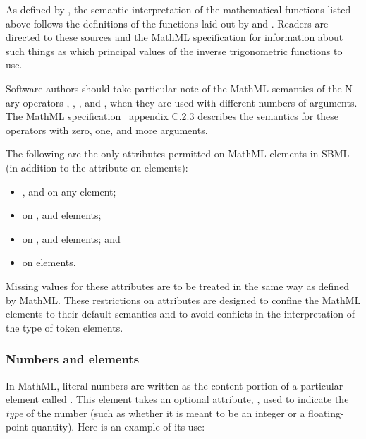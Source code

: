 As defined by \mathmltwo, the semantic interpretation of the
mathematical functions listed above follows the definitions of the
functions laid out by \cite{abramowitz:1997} and
\cite{zwillinger:1988}.  Readers are directed to these sources and
the MathML specification for information about such things as
which principal values of the inverse trigonometric functions to
use.

Software authors should take particular note of the MathML
semantics of the N-ary operators , ,
,  and , when they are used with
different numbers of arguments.  The MathML
specification~\citep{w3c:2000b} appendix C.2.3 describes the
semantics for these operators with zero, one, and more arguments.

The following are the only attributes permitted on MathML elements
in SBML (in addition to the  attribute on
 elements):
\begin{itemize}\setlength{\parskip}{-0.2ex}

\item {},  and  on any element;

\item {} on ,
     and  elements;

\item {} on , 
    and  elements; and

\item {} on  elements.

\end{itemize}\vspace*{-0.75ex}
Missing values for these attributes are to be treated in the same
way as defined by MathML.  These restrictions on attributes are
designed to confine the MathML elements to their default semantics
and to avoid conflicts in the interpretation of the type of token
elements.


\subsubsection{Numbers and  elements}
\label{sec:cn-token}
\label{sec:mathml-value-space}

In MathML, literal numbers are written as the content portion of a
particular element called .  This element takes an
optional attribute, , used to indicate the \emph{type}
of the number (such as whether it is meant to be an integer or a
floating-point quantity).  Here is an example of its use:

